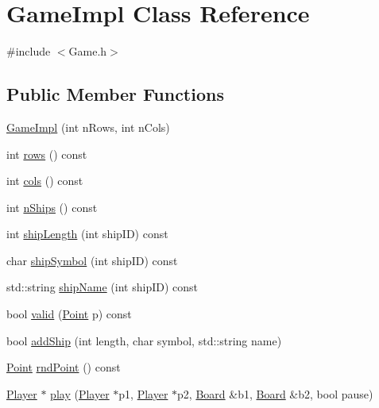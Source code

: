 \hypertarget{class_game_impl}{}\section{Game\+Impl Class Reference}
\label{class_game_impl}


{\ttfamily \#include $<$Game.\+h$>$}

\subsection*{Public Member Functions}
\begin{DoxyCompactItemize}
\item 
\mbox{\hyperlink{class_game_impl_a1ec88dfb57e180ee008cff4cf10934bf}{Game\+Impl}} (int n\+Rows, int n\+Cols)
\item 
int \mbox{\hyperlink{class_game_impl_a705c32b11b7cfaf9e8fd442c6434f7df}{rows}} () const
\item 
int \mbox{\hyperlink{class_game_impl_a73a94a0378afbe0ae9369afcdabc51ab}{cols}} () const
\item 
int \mbox{\hyperlink{class_game_impl_a15bfe27ab66ca758afaed1cc805c2f10}{n\+Ships}} () const
\item 
int \mbox{\hyperlink{class_game_impl_aa3b7b99102e9bcb3c9d06a1d3c672dc0}{ship\+Length}} (int ship\+ID) const
\item 
char \mbox{\hyperlink{class_game_impl_a1138859824715420317de50ffb15fdb9}{ship\+Symbol}} (int ship\+ID) const
\item 
std\+::string \mbox{\hyperlink{class_game_impl_ad39261b5f7198a6bacf99188e1108a50}{ship\+Name}} (int ship\+ID) const
\item 
bool \mbox{\hyperlink{class_game_impl_adae52d5fa830b6f0f0585e24cde3af3b}{valid}} (\mbox{\hyperlink{class_point}{Point}} p) const
\item 
bool \mbox{\hyperlink{class_game_impl_a181c0a610e9d11739dd1a96a73703103}{add\+Ship}} (int length, char symbol, std\+::string name)
\item 
\mbox{\hyperlink{class_point}{Point}} \mbox{\hyperlink{class_game_impl_a647d740893579abd77cc1d58ac600da7}{rnd\+Point}} () const
\item 
\mbox{\hyperlink{class_player}{Player}} $\ast$ \mbox{\hyperlink{class_game_impl_adf2cc88e7c3f617a7033512d05a6ba0c}{play}} (\mbox{\hyperlink{class_player}{Player}} $\ast$p1, \mbox{\hyperlink{class_player}{Player}} $\ast$p2, \mbox{\hyperlink{class_board}{Board}} \&b1, \mbox{\hyperlink{class_board}{Board}} \&b2, bool pause)
\end{DoxyCompactItemize}


